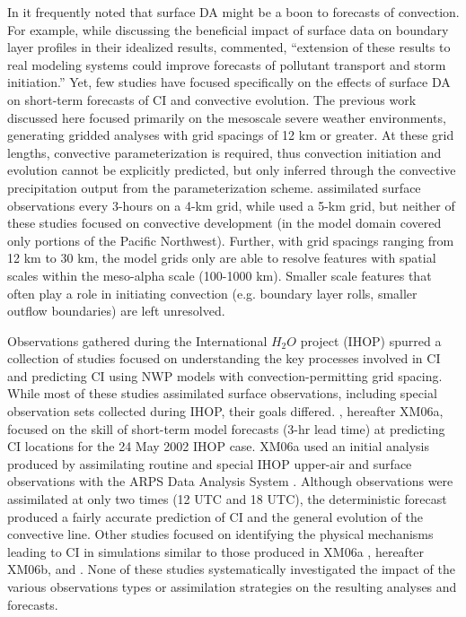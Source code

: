 In it frequently noted that surface DA might be a boon to forecasts of convection. For example, while discussing the beneficial impact of surface data on boundary layer profiles in their idealized results, \citet{hackersnyder05} commented, “extension of these results to real modeling systems could improve forecasts of pollutant transport and storm initiation.” Yet, few studies have focused specifically on the effects of surface DA on short-term forecasts of CI and convective evolution. The previous work discussed here focused primarily on the mesoscale severe weather environments, generating gridded analyses with grid spacings of 12 km or greater. At these grid lengths, convective parameterization is required, thus convection initiation and evolution cannot be explicitly predicted, but only inferred through the convective precipitation output from the parameterization scheme. \citet{ancell12} assimilated surface observations every 3-hours on a 4-km grid, while \citet{knopfmeierstensrud13} used a 5-km grid, but neither of these studies focused on convective development (in \citealt{ancell12} the model domain covered only portions of the Pacific Northwest). Further, with grid spacings ranging from 12 km to 30 km, the model grids only are able to resolve features with spatial scales within the meso-alpha scale (100-1000 km). Smaller scale features that often play a role in initiating convection (e.g. boundary layer rolls, smaller outflow boundaries) are left unresolved.

Observations gathered during the International \(H_2O\) project (IHOP) spurred a collection of studies focused on understanding the key processes involved in CI and predicting CI using NWP models with convection-permitting grid spacing. While most of these studies assimilated surface observations, including special observation sets collected during IHOP, their goals differed. \citet{xuemartin06a}, hereafter XM06a, focused on the skill of short-term model forecasts (3-hr lead time) at predicting CI locations for the 24 May 2002 IHOP case. XM06a used an initial analysis produced by assimilating routine and special IHOP upper-air and surface observations with the ARPS Data Analysis System \citep{brewster96}. Although observations were assimilated at only two times (12 UTC and 18 UTC), the deterministic forecast produced a fairly accurate prediction of CI and the general evolution of the convective line. Other studies focused on identifying the physical mechanisms leading to CI in simulations similar to those produced in XM06a \citep{xuemartin06b}, hereafter XM06b, and \citet{wangxue12}. None of these studies systematically investigated the impact of the various observations types or assimilation strategies on the resulting analyses and forecasts. 

